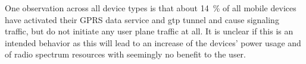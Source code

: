 One observation across all device types is that about \SI{14}{\percent} of all mobile devices have activated their \gls{GPRS} data service and \gls{gtp} tunnel and cause signaling traffic, but do not initiate any user plane traffic at all. It is unclear if this is an intended behavior as this will lead to an increase of the devices' power usage and of radio spectrum resources with seemingly no benefit to the user.